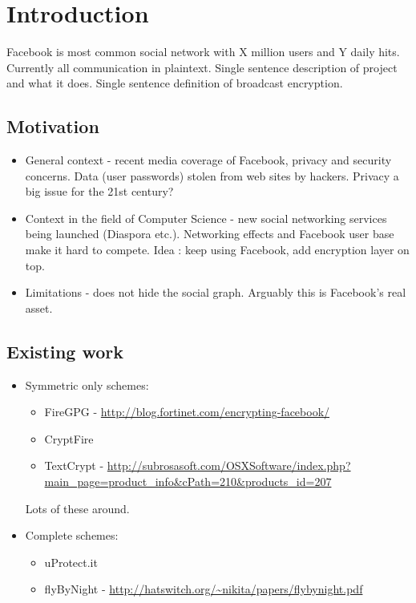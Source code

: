 \chapter{Introduction}\label{ch:introduction}

Facebook is most common social network with X million users and Y daily hits. Currently all communication in plaintext. Single sentence description of project and what it does. Single sentence definition of broadcast encryption.

\section{Motivation}

\begin{itemize}

    \item General context - recent media coverage of Facebook, privacy and security concerns. Data (user passwords) stolen from web sites by hackers. Privacy a big issue for the 21st century?
    
    \item Context in the field of Computer Science - new social networking services being launched (Diaspora etc.). Networking effects and Facebook user base make it hard to compete. Idea : keep using Facebook, add encryption layer on top.
    
    \item Limitations - does not hide the social graph. Arguably this is Facebook's real asset.

\end{itemize}


\section{Existing work}
\begin{itemize}
    \item Symmetric only schemes:
    
    \begin{itemize}
        \item FireGPG - \url{http://blog.fortinet.com/encrypting-facebook/}
        \item CryptFire
        \item TextCrypt - \url{http://subrosasoft.com/OSXSoftware/index.php?main_page=product_info&cPath=210&products_id=207}
    \end{itemize}
    
    Lots of these around.
    
    \item Complete schemes:
    
    \begin{itemize}
        \item uProtect.it
        \item flyByNight - \url{http://hatswitch.org/~nikita/papers/flybynight.pdf}
    \end{itemize}
\end{itemize}




